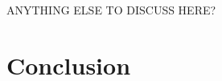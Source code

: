 \documentclass{article}
\begin{document}
ANYTHING ELSE TO DISCUSS HERE?




\section{Conclusion}\label{sec:Conclusion}
\end{document}
